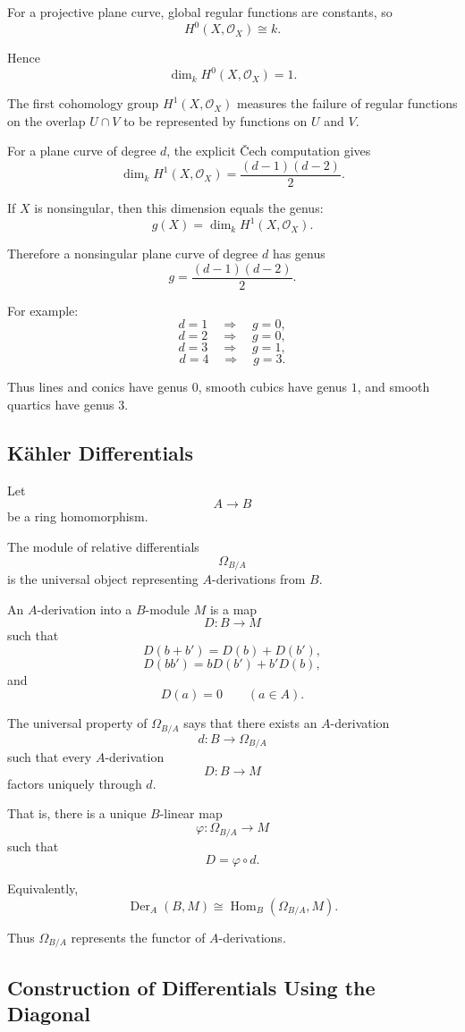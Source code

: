 For a projective plane curve, global regular functions are constants, so
\[
H^0(X,\mathcal O_X)\cong k.
\]

Hence
\[
\dim_k H^0(X,\mathcal O_X)=1.
\]

The first cohomology group $H^1(X,\mathcal O_X)$ measures the failure of
regular functions on the overlap $U\cap V$ to be represented by functions on
$U$ and $V$.

For a plane curve of degree $d$, the explicit \v{C}ech computation gives
\[
\dim_k H^1(X,\mathcal O_X)
=
\frac{(d-1)(d-2)}2.
\]

If $X$ is nonsingular, then this dimension equals the genus:
\[
g(X)=\dim_k H^1(X,\mathcal O_X).
\]

Therefore a nonsingular plane curve of degree $d$ has genus
\[
\boxed{
	g=\frac{(d-1)(d-2)}2.
}
\]

For example:
\[
d=1\quad\Rightarrow\quad g=0,
\]
\[
d=2\quad\Rightarrow\quad g=0,
\]
\[
d=3\quad\Rightarrow\quad g=1,
\]
\[
d=4\quad\Rightarrow\quad g=3.
\]

Thus lines and conics have genus $0$, smooth cubics have genus $1$, and
smooth quartics have genus $3$.

\subsection{K\"ahler Differentials}

Let
\[
A\to B
\]
be a ring homomorphism.

The module of relative differentials
\[
\Omega_{B/A}
\]
is the universal object representing $A$-derivations from $B$.

An $A$-derivation into a $B$-module $M$ is a map
\[
D:B\to M
\]
such that
\[
D(b+b')=D(b)+D(b'),
\]
\[
D(bb')=bD(b')+b'D(b),
\]
and
\[
D(a)=0
\qquad
(a\in A).
\]

The universal property of $\Omega_{B/A}$ says that there exists an
$A$-derivation
\[
d:B\to\Omega_{B/A}
\]
such that every $A$-derivation
\[
D:B\to M
\]
factors uniquely through $d$.

That is, there is a unique $B$-linear map
\[
\varphi:\Omega_{B/A}\to M
\]
such that
\[
D=\varphi\circ d.
\]

Equivalently,
\[
\operatorname{Der}_A(B,M)
\cong
\operatorname{Hom}_B(\Omega_{B/A},M).
\]

Thus $\Omega_{B/A}$ represents the functor of $A$-derivations.

\subsection{Construction of Differentials Using the Diagonal}

